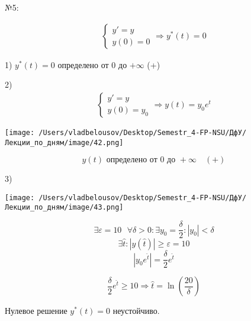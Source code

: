 \documentclass[12pt, a4paper]{report}
\begin{document}
№5: 

\[ \begin{aligned}
\begin{cases}
y ' = y \\ 
y(0 ) = 0 
\end{cases}
\Rightarrow y^* (t ) = 0
\end{aligned} \] 

1) \( y^*  (t ) = 0\)  определено от \( 0 \) до \( + \infty  \)  (+)

2) \[ \begin{aligned}
\begin{cases}
y ' = y \\ 
y(0 ) = y_0 
\end{cases}
\Rightarrow y(t ) = y_0 e^{t } 
\end{aligned} \]

\begin{center}
    \texttt{[image: /Users/vladbelousov/Desktop/Semestr\_4-FP-NSU/ДфУ/Лекции\_по\_дням/image/42.png]}
\end{center}

\[ y(t) \text{ определено от } 0 \text{ до }  + \infty  \quad  (+)  \] 

3) 

\begin{center}
    \texttt{[image: /Users/vladbelousov/Desktop/Semestr\_4-FP-NSU/ДфУ/Лекции\_по\_дням/image/43.png]}
\end{center}

\[ \exists  \varepsilon = 10 \text{ }  \forall  \delta > 0 : \exists  y_0= \frac{\delta}{2 } : \left\lvert y_0  \right\rvert < \delta  \] 
\[ \exists \hat{ t }  : \left\lvert y(\hat{t }  ) \right\rvert \ge \varepsilon = 10 \] 
\[ \left\lvert y_0 e^{\hat{t } }  \right\rvert = \frac{\delta}{2 } e^{\hat{ t } } \] 

\[ \frac{\delta}{2 }  e^{\hat{ t } } \ge 10 \Rightarrow \hat{ t }  = \ln \left( \frac{20}{\delta}  \right)  \] 

Нулевое решение \( y^* (t ) = 0\)  неустойчиво.

\ifdefined\mainfile
\else
    
\end{document}
